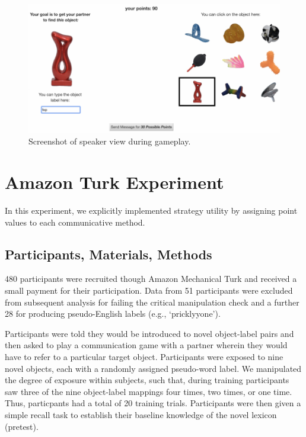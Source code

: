 \documentclass[10pt, letterpaper]{article}
\newenvironment{CodeChunk}{}{}
\begin{document}
\begin{CodeChunk}
\begin{figure}[H]

{\centering \includegraphics{figs/exp_screenshot-1} 

}

\caption[Screenshot of speaker view during gameplay]{Screenshot of speaker view during gameplay.}\label{fig:exp_screenshot}
\end{figure}
\end{CodeChunk}

\hypertarget{amazon-turk-experiment}{%
\section{Amazon Turk Experiment}\label{amazon-turk-experiment}}

In this experiment, we explicitly implemented strategy utility by
assigning point values to each communicative method.

\hypertarget{participants-materials-methods-1}{%
\subsection{Participants, Materials,
Methods}\label{participants-materials-methods-1}}

480 participants were recruited though Amazon Mechanical Turk and
received a small payment for their participation. Data from 51
participants were excluded from subsequent analysis for failing the
critical manipulation check and a further 28 for producing
pseudo-English labels (e.g., `pricklyyone').

Participants were told they would be introduced to novel object-label
pairs and then asked to play a communication game with a partner wherein
they would have to refer to a particular target object. Participants
were exposed to nine novel objects, each with a randomly assigned
pseudo-word label. We manipulated the degree of exposure within
subjects, such that, during training participants saw three of the nine
object-label mappings four times, two times, or one time. Thus,
particpants had a total of 20 training trials. Participants were then
given a simple recall task to establish their baseline knowledge of the
novel lexicon (pretest).
\end{document}

